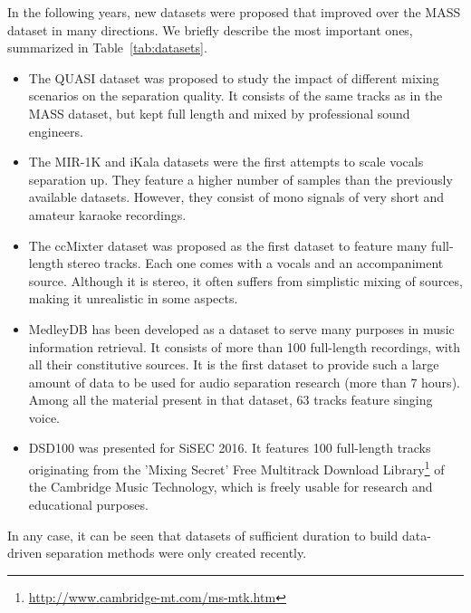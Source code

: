In the following years, new datasets were proposed that improved over the MASS dataset in many directions. We briefly describe the most important ones, summarized in Table~\ref{tab:datasets}.
\begin{itemize}[leftmargin=*]
	\item The QUASI dataset was proposed to study the impact of different mixing scenarios on the separation quality. It  consists of the same tracks as in the MASS dataset, but kept full length and mixed by professional sound engineers.
	\item The MIR-1K and iKala datasets were the first attempts to scale vocals separation up. They feature a higher number of samples than the previously available datasets. However, they consist of mono signals of very short and amateur karaoke recordings.
	\item The ccMixter dataset was proposed as the first dataset to feature many full-length stereo tracks. Each one comes with a vocals and an accompaniment source. Although it is stereo, it often suffers from simplistic mixing of sources, making it unrealistic in some aspects.
	\item MedleyDB has been developed as a dataset to serve many purposes in music information retrieval. It consists of more than 100 full-length recordings, with all their constitutive sources. It is the first dataset to provide such a large amount of data to be used for audio separation research (more than 7 hours). Among all the material present in that dataset, 63 tracks feature singing voice.
  \item DSD100 was presented for SiSEC 2016. It features 100 full-length tracks originating from the 'Mixing Secret' Free Multitrack Download Library\footnote{\url{http://www.cambridge-mt.com/ms-mtk.htm}} of the Cambridge Music Technology, which is freely usable for research and educational purposes.
\end{itemize}

In any case, it can be seen that datasets of sufficient duration to build data-driven separation methods were only created recently.

